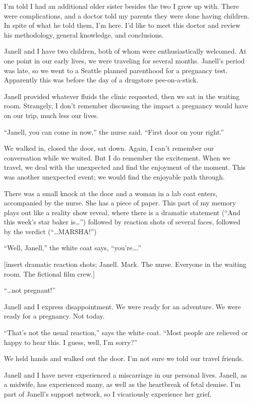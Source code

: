 \documentclass[
  letterpaper,
  DIV=11,
  numbers=noendperiod]{scrreprt}
\begin{document}
I'm told I had an additional older sister besides the two I grew up
with. There were complications, and a doctor told my parents they were
done having children. In spite of what he told them, I'm here. I'd like
to meet this doctor and review his methodology, general knowledge, and
conclusions.

Janell and I have two children, both of whom were enthusiastically
welcomed. At one point in our early lives, we were traveling for several
months. Janell's period was late, so we went to a Seattle planned
parenthood for a pregnancy test. Apparently this was before the day of a
drugstore pee-on-a-stick.

Janell provided whatever fluids the clinic requested, then we sat in the
waiting room. Strangely, I don't remember discussing the impact a
pregnancy would have on our trip, much less our lives.

``Janell, you can come in now,'' the nurse said. ``First door on your
right.''

We walked in, closed the door, sat down. Again, I can't remember our
conversation while we waited. But I do remember the excitement. When we
travel, we deal with the unexpected and find the enjoyment of the
moment. This was another unexpected event; we would find the enjoyable
path through.

There was a small knock at the door and a woman in a lab coat enters,
accompanied by the nurse. She has a piece of paper. This part of my
memory plays out like a reality show reveal, where there is a dramatic
statement (``And this week's star baker is\ldots{}'') followed by
reaction shots of several faces, followed by the verdict
(``\ldots MARSHA!'')

``Well, Janell,'' the white coat says, ``you're\ldots.''

{[}insert dramatic reaction shots; Janell. Mark. The nurse. Everyone in
the waiting room. The fictional film crew.{]}

``\ldots not pregnant!''

Janell and I express disappointment. We were ready for an adventure. We
were ready for a pregnancy. Not today.

``That's not the usual reaction,'' says the white coat. ``Most people
are relieved or happy to hear this. I guess, well, I'm sorry?''

We held hands and walked out the door. I'm not sure we told our travel
friends.

Janell and I have never experienced a miscarriage in our personal lives.
Janell, as a midwife, has experienced many, as well as the heartbreak of
fetal demise. I'm part of Janell's support network, so I vicariously
experience her grief.
\end{document}
